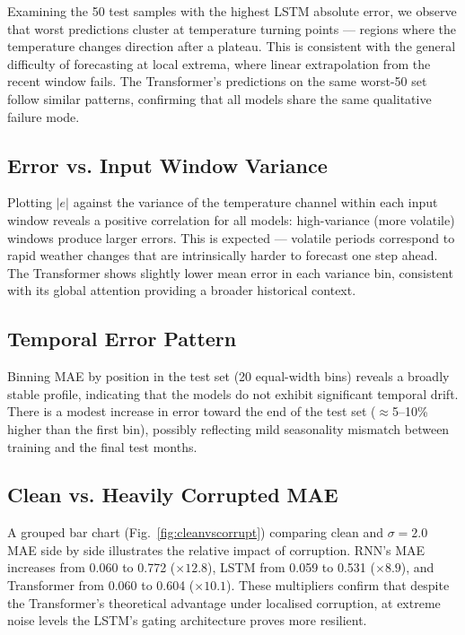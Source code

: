 \documentclass[runningheads]{llncs}
\begin{document}
Examining the 50 test samples with the highest LSTM absolute error, we observe that worst predictions cluster at temperature turning points — regions where the temperature changes direction after a plateau. This is consistent with the general difficulty of forecasting at local extrema, where linear extrapolation from the recent window fails. The Transformer's predictions on the same worst-50 set follow similar patterns, confirming that all models share the same qualitative failure mode.

\subsection{Error vs. Input Window Variance}
\label{sec:errvar}

Plotting $|e|$ against the variance of the temperature channel within each input window reveals a positive correlation for all models: high-variance (more volatile) windows produce larger errors. This is expected — volatile periods correspond to rapid weather changes that are intrinsically harder to forecast one step ahead. The Transformer shows slightly lower mean error in each variance bin, consistent with its global attention providing a broader historical context.

\subsection{Temporal Error Pattern}
\label{sec:temporal}

Binning MAE by position in the test set (20 equal-width bins) reveals a broadly stable profile, indicating that the models do not exhibit significant temporal drift. There is a modest increase in error toward the end of the test set ($\approx$5--10\% higher than the first bin), possibly reflecting mild seasonality mismatch between training and the final test months.

\subsection{Clean vs. Heavily Corrupted MAE}
\label{sec:cleanvscorrupt}

A grouped bar chart (Fig.~\ref{fig:cleanvscorrupt}) comparing clean and $\sigma=2.0$ MAE side by side illustrates the relative impact of corruption. RNN's MAE increases from 0.060 to 0.772 ($\times 12.8$), LSTM from 0.059 to 0.531 ($\times 8.9$), and Transformer from 0.060 to 0.604 ($\times 10.1$). These multipliers confirm that despite the Transformer's theoretical advantage under localised corruption, at extreme noise levels the LSTM's gating architecture proves more resilient.
\end{document}
